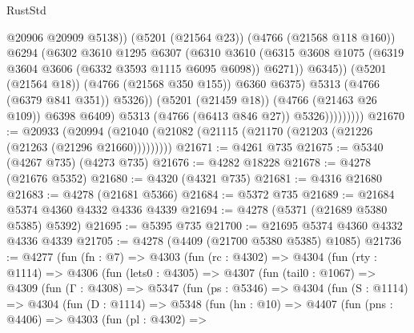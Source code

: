 \begin{lexlean}{RustStd}
\begin{coremodule}
                                    @20906
                                    @20909
                                    @5138))
                                (@5201 (@21564 @23))
                                (@4766 (@21568 @118 @160))
                                @6294
                                (@6302
                                  @3610
                                  @1295
                                  @6307
                                  (@6310
                                    @3610
                                    (@6315
                                      @3608
                                      @1075
                                      (@6319 @3604 @3606 (@6332 @3593 @1115 @6095 @6098))
                                      @6271))
                                  @6345))
                              (@5201 (@21564 @18))
                              (@4766 (@21568 @350 @155))
                              @6360
                              @6375)
                            @5313
                            (@4766 (@6379 @841 @351))
                            @5326))
                        (@5201 (@21459 @18))
                        (@4766 (@21463 @26 @109))
                        @6398
                        @6409)
                      @5313
                      (@4766 (@6413 @846 @27))
                      @5326)))))))))
@21670 := @20933
    (@20994 (@21040 (@21082 (@21115 (@21170 (@21203 (@21226 (@21263 (@21296 @21660)))))))))
@21671 := @4261 @735
@21675 := @5340 (@4267 @735) (@4273 @735)
@21676 := @4282 @18228
@21678 := @4278 (@21676 @5352)
@21680 := @4320 (@4321 @735)
@21681 := @4316 @21680
@21683 := @4278 (@21681 @5366)
@21684 := @5372 @735
@21689 := @21684 @5374 @4360 @4332 @4336 @4339
@21694 := @4278 (@5371 (@21689 @5380 @5385) @5392)
@21695 := @5395 @735
@21700 := @21695 @5374 @4360 @4332 @4336 @4339
@21705 := @4278 (@4409 (@21700 @5380 @5385) @1085)
@21736 := @4277
    (fun (fn : @7) =>
    @4303
      (fun (rc : @4302) =>
      @4304
        (fun (rty : @1114) =>
        @4306
          (fun (lets0 : @4305) =>
          @4307
            (fun (tail0 : @1067) =>
            @4309
              (fun (Γ : @4308) =>
              @5347
                (fun (ps : @5346) =>
                @4304
                  (fun (S : @1114) =>
                  @4304
                    (fun (D : @1114) =>
                    @5348
                      (fun (hn : @10) =>
                      @4407
                        (fun (pns : @4406) =>
                        @4303
                          (fun (pl : @4302) =>

\end{coremodule}
\end{lexlean}
